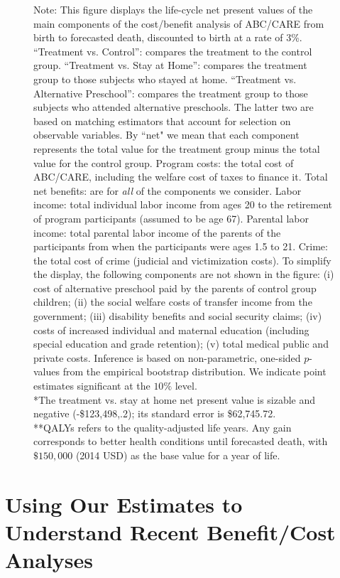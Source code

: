 \begin{figure}
Note: This figure displays the life-cycle net present values of the main components of the cost/benefit analysis of ABC/CARE from birth to forecasted death, discounted to birth at a rate of 3\%. ``Treatment vs. Control'': compares the treatment to the control group. ``Treatment vs. Stay at Home'': compares the treatment group to those subjects who stayed at home. ``Treatment vs. Alternative Preschool'': compares the treatment group to those subjects who attended alternative preschools. The latter two are based on matching estimators that account for selection on observable variables. By ``net" we mean that each component represents the total value for the treatment group minus the total value for the control group. Program costs: the total cost of ABC/CARE, including the welfare cost of taxes to finance it. Total net benefits: are for \textit{all} of the components we consider. Labor income: total individual labor income from ages 20 to the retirement of program participants (assumed to be age 67). Parental labor income: total parental labor income of the parents of the participants from when the participants were ages 1.5 to 21. Crime: the total cost of crime (judicial and victimization costs). To simplify the display, the following components are not shown in the figure: (i) cost of alternative preschool paid by the parents of control group children; (ii) the social welfare costs of transfer income from the government; (iii) disability benefits and social security claims; (iv) costs of increased individual and maternal education (including special education and grade retention); (v) total medical public and private costs. Inference is based on non-parametric, one-sided $p$-values from the empirical bootstrap distribution. We indicate point estimates significant at the $10\%$ level.\\
*The treatment vs. stay at home net present value is sizable and negative (-\$123,498,.2); its standard error is \$62,745.72.\\
**QALYs refers to the quality-adjusted life years. Any gain corresponds to better health conditions until forecasted death, with $\$150,000$ (2014 USD) as the base value for a year of life.\\
\end{figure}

\section{Using Our Estimates to Understand Recent Benefit/Cost Analyses}\label{section:bcaestimates}


